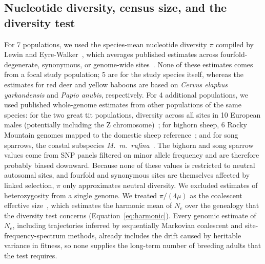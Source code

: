 \documentclass{article}
\begin{document}
\subsection{Nucleotide diversity, census size, and the diversity test}\label{sec:pi_methods}
For 7 populations, we used the species-mean nucleotide diversity $\pi$ compiled by Lewin and Eyre-Walker~\cite{lewin2026}, which averages published estimates across fourfold-degenerate, synonymous, or genome-wide sites~\cite{leffler2012,corbettdetig2015,xue2016,dutoit2017,chen2017,bergeron2023}. None of these estimates comes from a focal study population; 5 are for the study species itself, whereas the estimates for red deer and yellow baboons are based on \emph{Cervus elaphus yarkandensis} and \emph{Papio anubis}, respectively. For 4 additional populations, we used published whole-genome estimates from other populations of the same species: for the two great tit populations, diversity across all sites in 10 European males (potentially including the Z chromosome)~\cite{barton2019}; for bighorn sheep, 6 Rocky Mountain genomes mapped to the domestic sheep reference~\cite{wang2023}; and for song sparrows, the coastal subspecies \emph{M.\ m.\ rufina}~\cite{carbeck2023}. The bighorn and song sparrow values come from SNP panels filtered on minor allele frequency and are therefore probably biased downward. Because none of these values is restricted to neutral autosomal sites, and fourfold and synonymous sites are themselves affected by linked selection, $\pi$ only approximates neutral diversity. We excluded estimates of heterozygosity from a single genome. We treated $\pi/(4\mu)$ as the coalescent effective size~\cite{lewin2026}, which estimates the harmonic mean of $N_e$ over the genealogy that the diversity test concerns (Equation~\eqref{eq:harmonic}). Every genomic estimate of $N_e$, including trajectories inferred by sequentially Markovian coalescent and site-frequency-spectrum methods, already includes the drift caused by heritable variance in fitness, so none supplies the long-term number of breeding adults that the test requires.
\end{document}
